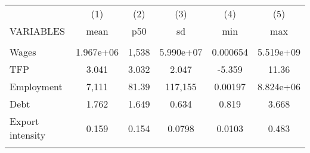 \documentclass[]{article}
\begin{document}
\begin{tabular}{lccccc} \hline
 & (1) & (2) & (3) & (4) & (5) \\
VARIABLES & mean & p50 & sd & min & max \\ \hline
 &  &  &  &  &  \\
Wages & 1.967e+06 & 1,538 & 5.990e+07 & 0.000654 & 5.519e+09 \\
TFP & 3.041 & 3.032 & 2.047 & -5.359 & 11.36 \\
Employment & 7,111 & 81.39 & 117,155 & 0.00197 & 8.824e+06 \\
Debt & 1.762 & 1.649 & 0.634 & 0.819 & 3.668 \\
Export intensity & 0.159 & 0.154 & 0.0798 & 0.0103 & 0.483 \\
 &  &  &  &  &  \\ \hline
\end{tabular}
\end{document}
